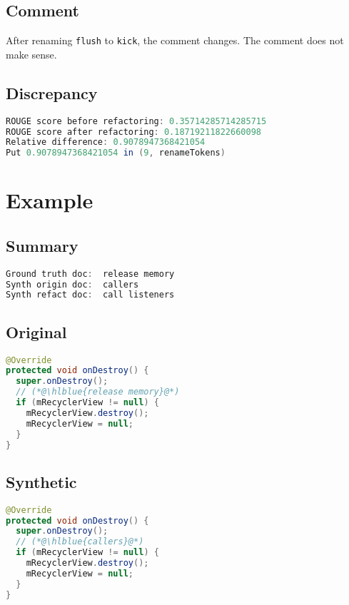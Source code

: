 \documentclass[11pt]{article}
\DeclareRobustCommand{\hlblue}[1]{{\sethlcolor{SeaGreen}\hl{#1}}}
\DeclareRobustCommand{\hlblue}[1]{{\sethlcolor{SkyBlue}\hl{#1}}}
\begin{document}
\subsection{Comment}

After renaming \texttt{flush} to \texttt{kick}, the comment changes. The comment does not make sense.

\subsection{Discrepancy}

\begin{lstlisting}[language=java]
ROUGE score before refactoring: 0.35714285714285715
ROUGE score after refactoring: 0.18719211822660098
Relative difference: 0.9078947368421054
Put 0.9078947368421054 in (9, renameTokens)
\end{lstlisting}



\pagebreak
\section{Example}
\subsection{Summary}

\begin{lstlisting}[language=java]
Ground truth doc:  release memory
Synth origin doc:  callers
Synth refact doc:  call listeners
\end{lstlisting}

\subsection{Original}
\begin{lstlisting}[language=java]
@Override
protected void onDestroy() {
  super.onDestroy();
  // (*@\hlblue{release memory}@*)
  if (mRecyclerView != null) {
    mRecyclerView.destroy();
    mRecyclerView = null;
  }
}
\end{lstlisting}
\subsection{Synthetic}

\begin{lstlisting}[language=java]
@Override
protected void onDestroy() {
  super.onDestroy();
  // (*@\hlblue{callers}@*)
  if (mRecyclerView != null) {
    mRecyclerView.destroy();
    mRecyclerView = null;
  }
}
\end{lstlisting}
\end{document}
